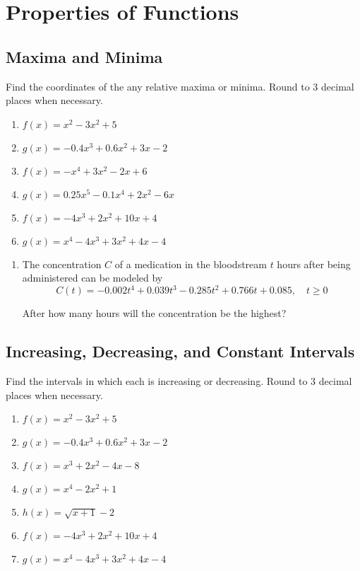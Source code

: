 \chapter{Properties of Functions}

\section{Maxima and Minima}

Find the coordinates of the any relative maxima or minima. Round to 3 decimal places when necessary.

\begin{enumerate}
\item $f(x) = x^2 - 3x^2 + 5$
\item $g(x) = -0.4x^3 + 0.6x^2 + 3x - 2$
\item $f(x) = -x^4+3x^2-2x+6$
\item $g(x) = 0.25x^5-0.1x^4+2x^2-6x$
\item $f(x) = -4x^3 + 2x^2 + 10x + 4$
\item $g(x) = x^4 - 4x^3 + 3x^2 + 4x - 4$
\setcounter{Review}{\value{enumi}}
\end{enumerate}

\begin{enumerate}
\setcounter{enumi}{\value{Review}}
\item The concentration $C$ of a medication in the bloodstream $t$ hours after being administered can be modeled by
\[ C(t) = -0.002t^4 + 0.039t^3 - 0.285t^2 + 0.766t + 0.085, \quad t \geq 0 \]

After how many hours will the concentration be the highest?
\end{enumerate}

\section{Increasing, Decreasing, and Constant Intervals}

Find the intervals in which each is increasing or decreasing. Round to 3 decimal places when necessary.

\begin{enumerate}
	\item $f(x) = x^2 - 3x^2 + 5$
	\item $g(x) = -0.4x^3 + 0.6x^2 + 3x - 2$
    \item $f(x) = x^3 + 2x^2 - 4x - 8$
    \item $g(x) = x^4 - 2x^2 + 1$
    \item $h(x) = \sqrt{x+1}-2$
    \item $f(x) = -4x^3 + 2x^2 + 10x + 4$
	\item $g(x) = x^4 - 4x^3 + 3x^2 + 4x - 4$
\end{enumerate}

